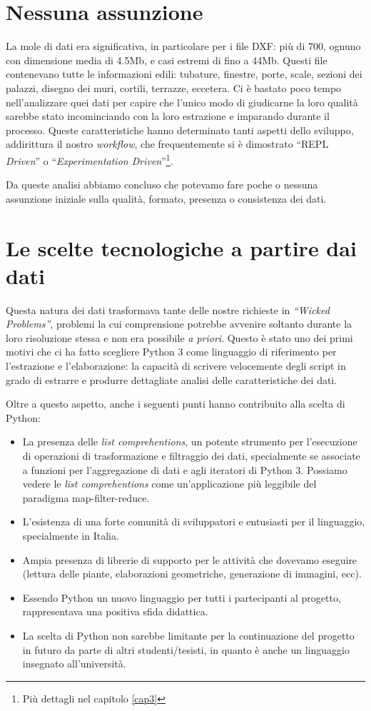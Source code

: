 \documentclass[12pt]{report}
\begin{document}
\section*{Nessuna assunzione}

La mole di dati era significativa, in particolare per i file DXF: più di
700, ognuno con dimensione media di 4.5Mb, e casi estremi di fino a
44Mb. Questi file contenevano tutte le informazioni edili: tubature,
finestre, porte, scale, sezioni dei palazzi, disegno dei muri,
cortili, terrazze, eccetera. Ci è bastato poco tempo nell'analizzare quei
dati per capire che l'unico modo di giudicarne la loro qualità sarebbe
stato incominciando con la loro estrazione e imparando durante il
processo. Queste caratteristiche hanno determinato tanti aspetti dello
sviluppo, addirittura il nostro \textit{workflow}, che frequentemente si è
dimostrato ``REPL \textit{Driven}'' o ``\textit{Experimentation
Driven}''\footnote{Più dettagli nel capitolo \ref{cap3}}. 

Da queste analisi abbiamo concluso che potevamo fare poche o nessuna
assunzione iniziale sulla qualità, formato, presenza o consistenza dei dati.

\section{Le scelte tecnologiche a partire dai dati}

Questa natura dei dati trasformava tante delle nostre richieste in
\textit{``Wicked Problems''}, problemi la cui comprensione potrebbe
avvenire soltanto durante la loro risoluzione stessa e non era
possibile \textit{a priori}. Questo è stato uno dei primi motivi che
ci ha fatto scegliere Python 3 come linguaggio di riferimento per
l'estrazione e l'elaborazione: la capacità di scrivere velocemente
degli script in grado di estrarre e produrre dettagliate analisi delle
caratteristiche dei dati. 

Oltre a questo aspetto, anche i seguenti punti hanno contribuito
alla scelta di Python:
\begin{itemize}
  \item La presenza delle \textit{list comprehentions}, un potente
strumento per l'esecuzione di operazioni di trasformazione e
filtraggio dei dati, specialmente se associate a funzioni per
l'aggregazione di dati e agli iteratori di Python 3. Possiamo vedere
le \textit{list comprehentions} come un'applicazione più leggibile del
paradigma map-filter-reduce.
  \item L'esistenza di una forte comunità di sviluppatori e entusiasti
per il linguaggio, specialmente in Italia.
  \item Ampia presenza di librerie di supporto per le attività che
dovevamo eseguire (lettura delle piante, elaborazioni geometriche,
generazione di immagini, ecc).
  \item Essendo Python un nuovo linguaggio per tutti i partecipanti al
progetto, rappresentava una positiva sfida didattica.
  \item La scelta di Python non sarebbe limitante per la continuazione
del progetto in futuro da parte di altri studenti/tesisti, in quanto è
anche un linguaggio insegnato all'università.
\end{itemize}
\end{document}
